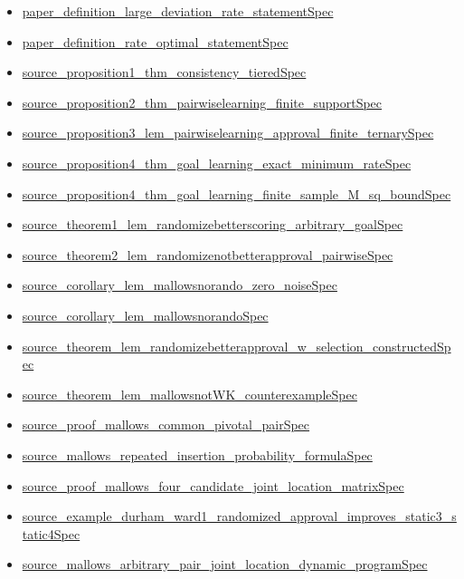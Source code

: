 \documentclass[10pt]{article}
\begin{document}
\begin{itemize}[leftmargin=1.2em]
\begin{itemize}[leftmargin=1.2em]
\item \hyperlink{source-claim-c61b482940640a59}{paper\_definition\_large\_deviation\_rate\_statementSpec}
\item \hyperlink{source-claim-c1b6c1660b45dd91}{paper\_definition\_rate\_optimal\_statementSpec}
\item \hyperlink{source-claim-80ef2800a9578ca5}{source\_proposition1\_thm\_consistency\_tieredSpec}
\item \hyperlink{source-claim-c74374c73696b398}{source\_proposition2\_thm\_pairwiselearning\_finite\_supportSpec}
\item \hyperlink{source-claim-baeee6d035a90ee1}{source\_proposition3\_lem\_pairwiselearning\_approval\_finite\_ternarySpec}
\item \hyperlink{source-claim-2576e5b507810949}{source\_proposition4\_thm\_goal\_learning\_exact\_minimum\_rateSpec}
\item \hyperlink{source-claim-6a7da73327f0abda}{source\_proposition4\_thm\_goal\_learning\_finite\_sample\_M\_sq\_boundSpec}
\item \hyperlink{source-claim-f4c362962779355c}{source\_theorem1\_lem\_randomizebetterscoring\_arbitrary\_goalSpec}
\item \hyperlink{source-claim-82eaa4a544e4300f}{source\_theorem2\_lem\_randomizenotbetterapproval\_pairwiseSpec}
\item \hyperlink{source-claim-c1058349a9163721}{source\_corollary\_lem\_mallowsnorando\_zero\_noiseSpec}
\item \hyperlink{source-claim-57ef0e97610a7efd}{source\_corollary\_lem\_mallowsnorandoSpec}
\item \hyperlink{source-claim-b02fd12e20da7ee2}{source\_theorem\_lem\_randomizebetterapproval\_w\_selection\_constructedSpec}
\item \hyperlink{source-claim-96dd41305a1cb5af}{source\_theorem\_lem\_mallowsnotWK\_counterexampleSpec}
\item \hyperlink{source-claim-183efad42b03de32}{source\_proof\_mallows\_common\_pivotal\_pairSpec}
\item \hyperlink{source-claim-909010c9cf279ba2}{source\_mallows\_repeated\_insertion\_probability\_formulaSpec}
\item \hyperlink{source-claim-b4c9d86dce53081b}{source\_proof\_mallows\_four\_candidate\_joint\_location\_matrixSpec}
\item \hyperlink{source-claim-ddc5814263488e0b}{source\_example\_durham\_ward1\_randomized\_approval\_improves\_static3\_static4Spec}
\item \hyperlink{source-claim-1b3901556fea513f}{source\_mallows\_arbitrary\_pair\_joint\_location\_dynamic\_programSpec}
\end{itemize}
\end{itemize}
\end{document}
